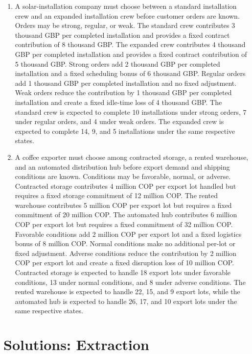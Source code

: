 \begin{enumerate}[leftmargin=0.22in]
		\item
		A solar-installation company must choose between a standard installation crew and an expanded installation crew before customer orders are known. Orders may be strong, regular, or weak. The standard crew contributes 3 thousand GBP per completed installation and provides a fixed contract contribution of 8 thousand GBP. The expanded crew contributes 4 thousand GBP per completed installation and provides a fixed contract contribution of 5 thousand GBP. Strong orders add 2 thousand GBP per completed installation and a fixed scheduling bonus of 6 thousand GBP. Regular orders add 1 thousand GBP per completed installation and no fixed adjustment. Weak orders reduce the contribution by 1 thousand GBP per completed installation and create a fixed idle-time loss of 4 thousand GBP. The standard crew is expected to complete 10 installations under strong orders, 7 under regular orders, and 4 under weak orders. The expanded crew is expected to complete 14, 9, and 5 installations under the same respective states.
		
		\item
		A coffee exporter must choose among contracted storage, a rented warehouse, and an automated distribution hub before export demand and shipping conditions are known. Conditions may be favorable, normal, or adverse. Contracted storage contributes 4 million COP per export lot handled but requires a fixed storage commitment of 12 million COP. The rented warehouse contributes 5 million COP per export lot but requires a fixed commitment of 20 million COP. The automated hub contributes 6 million COP per export lot but requires a fixed commitment of 32 million COP. Favorable conditions add 2 million COP per export lot and a fixed logistics bonus of 8 million COP. Normal conditions make no additional per-lot or fixed adjustment. Adverse conditions reduce the contribution by 2 million COP per export lot and create a fixed disruption loss of 10 million COP. Contracted storage is expected to handle 18 export lots under favorable conditions, 13 under normal conditions, and 8 under adverse conditions. The rented warehouse is expected to handle 22, 15, and 9 export lots, while the automated hub is expected to handle 26, 17, and 10 export lots under the same respective states.
		
	\end{enumerate}
	
	\newpage
	\newpage
	\section{Solutions: Extraction}
	\label{sec:solutions-extraction}
	
